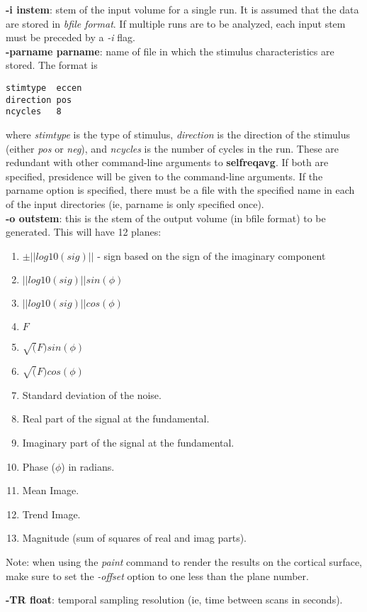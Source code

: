 \documentclass[10pt]{article}
\begin{document}
\noindent
{\bf -i instem}: stem of the input volume for a single run.
It is assumed that the data are stored in {\em bfile format}.  If
multiple runs are to be analyzed, each input stem must be preceded by
a {\em -i} flag.\\

\noindent
{\bf -parname parname}: name of file in which the stimulus characteristics
are stored. The format is
\begin{verbatim}
stimtype  eccen
direction pos
ncycles   8
\end{verbatim}
where {\em stimtype} is the type of stimulus, {\em direction} is the
direction of the stimulus (either {\em pos} or {\em neg}), and {\em
ncycles} is the number of cycles in the run.  These are redundant with
other command-line arguments to {\bf selfreqavg}.  If both are
specified, presidence will be given to the command-line arguments.  If
the parname option is specified, there must be a file with the
specified name in each of the input directories (ie, parname is only
specified once).\\

\noindent
{\bf -o outstem}: this is the stem of the output volume (in bfile format)
to be generated.  This will have 12 planes:
\begin{enumerate}
\item $\pm ||log10(sig)||$ - sign based on the sign of the imaginary component
\item $||log10(sig)|| sin(\phi)$ 
\item $||log10(sig)|| cos(\phi)$ 
\item $F$
\item $\sqrt(F) sin(\phi)$ 
\item $\sqrt(F) cos(\phi)$ 
\item Standard deviation of the noise.
\item Real part of the signal at the fundamental.
\item Imaginary part of the signal at the fundamental.
\item Phase ($\phi$) in radians.
\item Mean Image.
\item Trend Image.
\item Magnitude (sum of squares of real and imag parts).
\end{enumerate}
Note: when using the {\em paint} command to render the results on the
cortical surface, make sure to set the {\em -offset} option to one
less than the plane number.

\noindent
{\bf -TR float}: temporal sampling resolution (ie, time between scans
in seconds). \\
\end{document}
